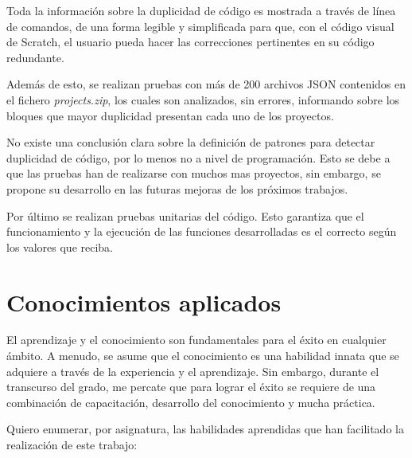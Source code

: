 \documentclass[a4paper, 12pt]{book}
\begin{document}
Toda la información sobre la duplicidad de código es mostrada a través de línea de comandos, de una forma legible y simplificada para que, con el código visual de Scratch, el usuario pueda hacer las correcciones pertinentes en su código redundante. 

Además de esto, se realizan pruebas con más de 200 archivos JSON contenidos en el fichero \textit{projects.zip}, los cuales son analizados, sin errores, informando sobre los bloques que mayor duplicidad presentan cada uno de los proyectos.

No existe una conclusión clara sobre la definición de patrones para detectar duplicidad de código, por lo menos no a nivel de programación. Esto se debe a que las pruebas han de realizarse con muchos mas proyectos, sin embargo, se propone su desarrollo en las futuras mejoras de los próximos trabajos.

Por último se realizan pruebas unitarias del código. Esto garantiza que el funcionamiento y la ejecución de las funciones desarrolladas es el correcto según los valores que reciba.

\section{Conocimientos aplicados}
\label{sec:aplicacion}


El aprendizaje y el conocimiento son fundamentales para el éxito en cualquier ámbito. A menudo, se asume que el conocimiento es una habilidad innata que se adquiere a través de la experiencia y el aprendizaje. Sin embargo, durante el transcurso del grado, me percate que para lograr el éxito se requiere de una combinación de capacitación, desarrollo del conocimiento y mucha práctica.

Quiero enumerar, por asignatura, las habilidades aprendidas que han facilitado la realización de este trabajo:
\end{document}
